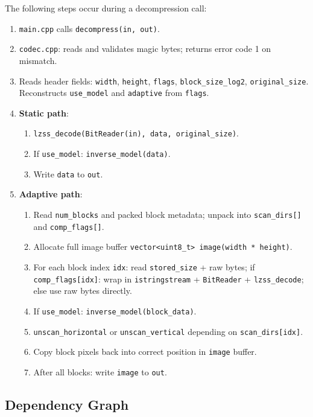 The following steps occur during a decompression call:

\begin{enumerate}
  \item \texttt{main.cpp} calls \texttt{decompress(in, out)}.
  \item \texttt{codec.cpp}: reads and validates magic bytes; returns error code 1 on mismatch.
  \item Reads header fields: \texttt{width}, \texttt{height}, \texttt{flags}, \texttt{block\_size\_log2},
        \texttt{original\_size}. Reconstructs \texttt{use\_model} and \texttt{adaptive} from \texttt{flags}.
  \item \textbf{Static path}:
    \begin{enumerate}
      \item \texttt{lzss\_decode(BitReader(in), data, original\_size)}.
      \item If \texttt{use\_model}: \texttt{inverse\_model(data)}.
      \item Write \texttt{data} to \texttt{out}.
    \end{enumerate}
  \item \textbf{Adaptive path}:
    \begin{enumerate}
      \item Read \texttt{num\_blocks} and packed block metadata; unpack into \texttt{scan\_dirs[]}
            and \texttt{comp\_flags[]}.
      \item Allocate full image buffer \texttt{vector\textless uint8\_t\textgreater{} image(width * height)}.
      \item For each block index \texttt{idx}: read \texttt{stored\_size} + raw bytes;
            if \texttt{comp\_flags[idx]}: wrap in \texttt{istringstream} + \texttt{BitReader} +
            \texttt{lzss\_decode}; else use raw bytes directly.
      \item If \texttt{use\_model}: \texttt{inverse\_model(block\_data)}.
      \item \texttt{unscan\_horizontal} or \texttt{unscan\_vertical} depending on \texttt{scan\_dirs[idx]}.
      \item Copy block pixels back into correct position in \texttt{image} buffer.
      \item After all blocks: write \texttt{image} to \texttt{out}.
    \end{enumerate}
\end{enumerate}

\subsection{Dependency Graph}


